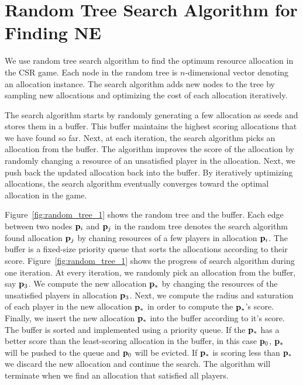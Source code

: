 \section{Random Tree Search Algorithm for Finding NE}\label{sec:apx-alg}
We use random tree search algorithm to find the optimum resource allocation in the CSR game.
Each node in the random tree is $n$-dimensional vector denoting an allocation instance.
The search algorithm adds new nodes to the tree by sampling new allocations and optimizing the cost of each allocation iteratively.

The search algorithm starts by randomly generating a few allocation as seeds and stores them in a buffer.
This buffer maintains the highest scoring allocations that we have found so far.
Next, at each iteration, the search algorithm picks an allocation from the buffer.
The algorithm improves the score of the allocation by randomly changing a resource of an unsatisfied player in the allocation. Next, we push back the updated allocation back into the buffer.
By iteratively uptimizing allocations, the search algorithm eventually converges toward the optimal allocation in the game.



Figure~\ref{fig:random_tree_1} shows the random tree and the buffer. Each edge between two nodes ${\bf p}_i$ and ${\bf p}_j$ in the random tree denotes the search algorithm found allocation ${\bf p}_j$ by chaning resources of a few players in allocation ${\bf p}_i$. The buffer is a fixed-size priority queue that sorts the allocations according to their score.
Figure~\ref{fig:random_tree_1} shows the progress of search algorithm during one iteration.
At every iteration, we randomly pick an allocation from the buffer, say ${\bf p}_3$. We compute the new allocation ${\bf p}_*$ by changing the resources of the unsatisfied players in allocation ${\bf p}_3$. Next, we compute the radius and saturation of each player in the new allocation ${\bf p}_*$ in order to compute the ${\bf p}_*$'s score. Finally, we insert the new allocation ${\bf p}_*$ into the buffer according to it's score. The buffer is sorted and implemented using a priority queue. If the ${\bf p}_*$ has a better score than the least-scoring allocation in the buffer, in this case ${\bf p}_0$, ${\bf p}_*$ will be pushed to the queue and ${\bf p}_0$ will be evicted. If ${\bf p}_*$ is scoring less than ${\bf p}_*$ we discard the new allocation and continue the search. The algorithm will terminate when we find an allocation that satisfied all players.

